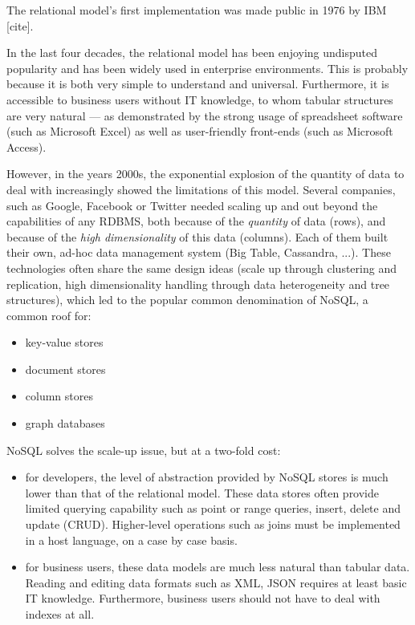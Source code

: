\documentclass{vldb}
\begin{document}
The relational model's first implementation was made public in 1976 by IBM [cite].

In the last four decades, the relational model has been enjoying undisputed popularity and has been widely used in enterprise environments. This is probably because it is both very simple to understand and universal. Furthermore, it is accessible to business users without IT knowledge, to whom tabular structures are very natural --- as demonstrated by the strong usage of spreadsheet software (such as Microsoft Excel) as well as user-friendly front-ends (such as Microsoft Access).

However, in the years 2000s, the exponential explosion of the quantity of data to deal with increasingly showed the limitations of this model. Several companies, such as Google, Facebook or Twitter needed scaling up and out beyond the capabilities of any RDBMS, both because of the \emph{quantity} of data (rows), and because of the \emph{high dimensionality} of this data (columns). Each of them built their own, ad-hoc data management system (Big Table, Cassandra, ...). These technologies often share the same design ideas (scale up through clustering and replication, high dimensionality handling through data heterogeneity and tree structures), which led to the popular common denomination of NoSQL, a common roof for:
\begin{itemize}
\item key-value stores
\item document stores
\item column stores
\item graph databases
\end{itemize}

NoSQL solves the scale-up issue, but at a two-fold cost:
\begin{itemize}
\item for developers, the level of abstraction provided by NoSQL stores is much lower than that of the relational model. These data stores often provide limited querying capability such as point or range queries, insert, delete and update (CRUD). Higher-level operations such as joins must be implemented in a host language, on a case by case basis.
\item for business users, these data models are much less natural than tabular data. Reading and editing data formats such as XML, JSON requires at least basic IT knowledge. Furthermore, business users should not have to deal with indexes at all.
\end{itemize}
\end{document}
